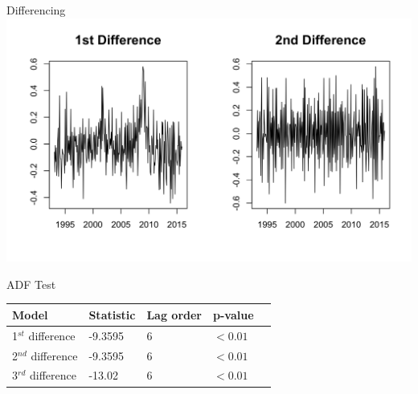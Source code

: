 \documentclass[ignorenonframetext]{beamer}
\begin{document}
  	\begin{frame}{Differencing}
		\includegraphics[width=\linewidth]{images/seasonalunem}
  	\end{frame}
 
  	\begin{frame}{ADF Test}
		 \begin{table}[htb]
		 \centering
		 \begin{tabular}{lllll}
		 \hline
		 \textbf{Model} & \textbf{Statistic} & \textbf{Lag order} & \textbf{p-value}\\ \hline
		  1\(^{st}\) difference &  -9.3595 & 6 &\( < 0.01\)\\
		  2\(^{nd}\) difference &  -9.3595 & 6 & \( < 0.01\)\\			  
		  3\(^{rd}\) difference &  -13.02 & 6 & \( < 0.01\)\\		 \hline
		 \end{tabular}
		 \end{table}
  	\end{frame}
 
\end{document}
